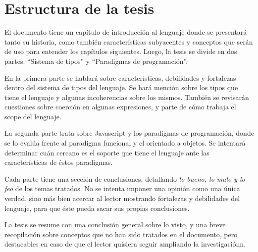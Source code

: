 \section{Estructura de la tesis}

El documento tiene un capítulo de introducción al lenguaje donde se presentará tanto su historia, como también características subyacentes y conceptos que serán de uso para entender los capítulos siguientes. Luego, la tesis se divide en dos partes: "`Sistema de tipos"' y "`Paradigmas de programación"'. 

En la primera parte se hablará sobre características, debilidades y fortalezas dentro del sistema de tipos del lenguaje. Se hará mención sobre los tipos que tiene el lenguaje y algunas incoherencias sobre los mismos. También se revisarán cuestiones sobre coerción en algunas expresiones, y parte de cómo trabaja el scope del lenguaje.

La segunda parte trata sobre Javascript y los paradigmas de programación, donde se lo evalúa frente al paradigma funcional y el orientado a objetos. Se intentará determinar cuán cercano es el soporte que tiene el lenguaje ante las características de éstos paradigmas.

Cada parte tiene una sección de conclusiones, detallando \textit{lo bueno, lo malo y lo feo} de los temas tratados. No se intenta imponer una opinión como una única verdad, sino más bien acercar al lector mostrando fortalezas y debilidades del lenguaje, para que éste pueda sacar sus propias conclusiones.

La tesis se resume con una conclusión general sobre lo visto, y una breve recopilación sobre conceptos que no han sido tratados en el documento, pero destacables en caso de que el lector quisiera seguir ampliando la investigaciónn.